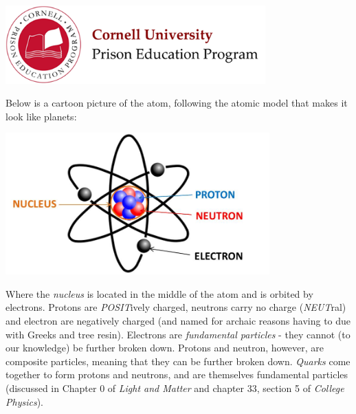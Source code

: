 \documentclass[12pt]{exam}
\begin{document}

\begin{flushright}
\vspace{0.2in}

\end{flushright}

\begin{center}
\includegraphics[width=10cm]{../images/logo.png}
\end{center}

\begin{center}
\end{center}
\vspace{0.2in}

Below is a cartoon picture of the atom, following the atomic model that makes it look like planets:

\noindent \begin{center}\includegraphics[width=4in]{../images/atom.jpg}\end{center}

Where the \textit{nucleus} is located in the middle of the atom and is orbited by electrons. Protons are \textit{POSIT}ively charged, neutrons carry no charge (\textit{NEUT}ral) and electron are negatively charged (and named for archaic reasons having to due with Greeks and tree resin). Electrons are \textit{fundamental particles} - they cannot (to our knowledge) be further broken down. Protons and neutron, however, are composite particles, meaning that they can be further broken down. \textit{Quarks} come together to form protons and neutrons, and are themselves fundamental particles (discussed in Chapter 0 of \textit{Light and Matter} and chapter 33, section 5 of \textit{College Physics}).
\end{document}
